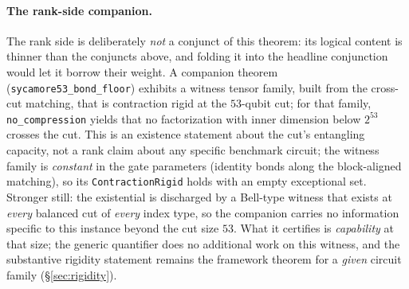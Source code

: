 \documentclass[sigplan,10pt,screen,review,anonymous]{acmart}
\begin{document}
\paragraph{The rank-side companion.} The rank side is deliberately \emph{not} a conjunct of
this theorem: its logical content is thinner than the conjuncts above, and folding it into
the headline conjunction would let it borrow their weight. A companion theorem
(\lstinline|sycamore53_bond_floor|) exhibits a witness tensor family, built from the
cross-cut matching, that is contraction rigid at the $53$-qubit cut; for that family,
\lstinline|no_compression| yields that no factorization with inner dimension below $2^{53}$
crosses the cut. This is an existence statement about the cut's entangling capacity, not a
rank claim about any specific benchmark circuit; the witness family is \emph{constant} in
the gate parameters (identity bonds along the block-aligned matching), so its
\lstinline|ContractionRigid| holds with an empty exceptional set. Stronger still: the
existential is discharged by a Bell-type witness that exists at \emph{every} balanced cut
of \emph{every} index type, so the companion carries no information specific to this
instance beyond the cut size $53$. What it certifies is \emph{capability} at that size; the
generic quantifier does no additional work on this witness, and the substantive rigidity
statement remains the framework theorem for a \emph{given} circuit family
(\S\ref{sec:rigidity}).
\end{document}

